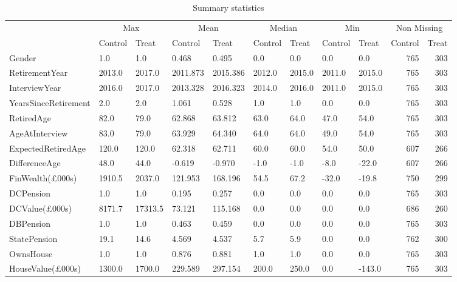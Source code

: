 \begin{table}

\caption{Summary statistics \label{tab:sum_stats} }
\centering
\fontsize{10}{12}\selectfont
\begin{tabular}[t]{lllllllllrr}
\toprule
\multicolumn{1}{c}{ } & \multicolumn{2}{c}{Max} & \multicolumn{2}{c}{Mean} & \multicolumn{2}{c}{Median} & \multicolumn{2}{c}{Min} & \multicolumn{2}{c}{Non Missing} \\
\cmidrule(l{3pt}r{3pt}){2-3} \cmidrule(l{3pt}r{3pt}){4-5} \cmidrule(l{3pt}r{3pt}){6-7} \cmidrule(l{3pt}r{3pt}){8-9} \cmidrule(l{3pt}r{3pt}){10-11}
 & Control & Treat & Control & Treat & Control & Treat & Control & Treat & Control & Treat\\
\midrule
Gender & 1.0 & 1.0 & 0.468 & 0.495 & 0.0 & 0.0 & 0.0 & 0.0 & 765 & 303\\
RetirementYear & 2013.0 & 2017.0 & 2011.873 & 2015.386 & 2012.0 & 2015.0 & 2011.0 & 2015.0 & 765 & 303\\
InterviewYear & 2016.0 & 2017.0 & 2013.328 & 2016.323 & 2014.0 & 2016.0 & 2011.0 & 2015.0 & 765 & 303\\
YearsSinceRetirement & 2.0 & 2.0 & 1.061 & 0.528 & 1.0 & 1.0 & 0.0 & 0.0 & 765 & 303\\
RetiredAge & 82.0 & 79.0 & 62.868 & 63.812 & 63.0 & 64.0 & 47.0 & 54.0 & 765 & 303\\
\addlinespace
AgeAtInterview & 83.0 & 79.0 & 63.929 & 64.340 & 64.0 & 64.0 & 49.0 & 54.0 & 765 & 303\\
ExpectedRetiredAge & 120.0 & 120.0 & 62.318 & 62.711 & 60.0 & 60.0 & 54.0 & 50.0 & 607 & 266\\
DifferenceAge & 48.0 & 44.0 & -0.619 & -0.970 & -1.0 & -1.0 & -8.0 & -22.0 & 607 & 266\\
FinWealth(£000s) & 1910.5 & 2037.0 & 121.953 & 168.196 & 54.5 & 67.2 & -32.0 & -19.8 & 750 & 299\\
DCPension & 1.0 & 1.0 & 0.195 & 0.257 & 0.0 & 0.0 & 0.0 & 0.0 & 765 & 303\\
\addlinespace
DCValue(£000s) & 8171.7 & 17313.5 & 73.121 & 115.168 & 0.0 & 0.0 & 0.0 & 0.0 & 686 & 260\\
DBPension & 1.0 & 1.0 & 0.463 & 0.459 & 0.0 & 0.0 & 0.0 & 0.0 & 765 & 303\\
StatePension & 19.1 & 14.6 & 4.569 & 4.537 & 5.7 & 5.9 & 0.0 & 0.0 & 762 & 300\\
OwnsHouse & 1.0 & 1.0 & 0.876 & 0.881 & 1.0 & 1.0 & 0.0 & 0.0 & 765 & 303\\
HouseValue(£000s) & 1300.0 & 1700.0 & 229.589 & 297.154 & 200.0 & 250.0 & 0.0 & -143.0 & 765 & 303\\

\end{tabular}
\end{table}
